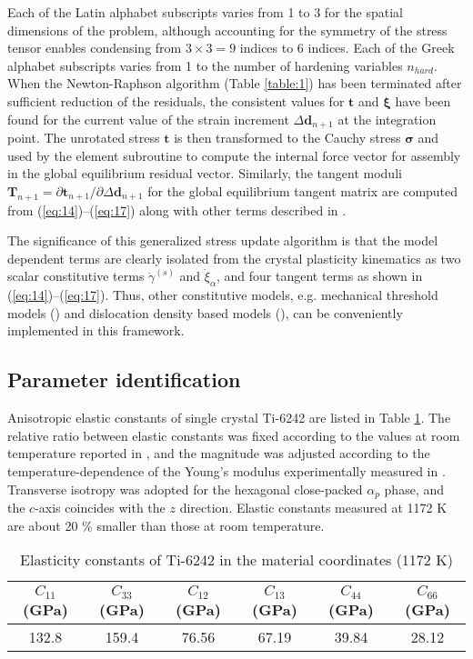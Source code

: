 \documentclass[review]{elsarticle}
\begin{document}
	Each of the Latin alphabet subscripts varies from 1 to 3 for the spatial dimensions of the problem, although accounting for the symmetry of the stress tensor enables condensing from $3\times 3=9$ indices to 6 indices.
	Each of the Greek alphabet subscripts varies from 1 to the number of hardening variables $n_{hard}$.
	When the Newton-Raphson algorithm (Table \ref{table:1}) has been terminated after sufficient reduction of the residuals, the consistent values for $\mathbf{t}$ and $\bm{\xi}$ have been found for the current value of the strain increment $\Delta \mathbf{d}_{n+1}$ at the integration point.
	The unrotated stress $\mathbf{t}$ is then transformed to the Cauchy stress $\bm{\sigma}$ and used by the element subroutine to compute the internal force vector for assembly in the global equilibrium residual vector.
	Similarly, the tangent moduli $\mathbf{T}_{n+1}=\partial \mathbf{t}_{n+1} / \partial \Delta\mathbf{d}_{n+1}$ for the global equilibrium tangent matrix are computed from (\ref{eq:14})--(\ref{eq:17}) along with other terms described in \cite{r22}.
	
	The significance of this generalized stress update algorithm is that the model dependent terms are clearly isolated from the crystal plasticity kinematics as two scalar constitutive terms $\dot{\gamma}^{(s)}$ and $\dot{\xi}_{\alpha}$, and four tangent terms as shown in (\ref{eq:14})--(\ref{eq:17}).
	Thus, other constitutive models, e.g. mechanical threshold models (\cite{r24}) and dislocation density based models (\cite{r25}), can be conveniently implemented in this framework.

	\subsection{Parameter identification}
	\label{parameter}
	Anisotropic elastic constants of single crystal Ti-6242 are listed in Table \ref{table:2}.
	The relative ratio between elastic constants was fixed according to the values at room temperature reported in \cite{r18}, and the magnitude was adjusted according to the temperature-dependence of the Young's modulus experimentally measured in \cite{r26}.
	Transverse isotropy was adopted for the hexagonal close-packed $\alpha _p$ phase, and the $c$-axis coincides with the $z$ direction.
	Elastic constants measured at 1172 K are about 20 \% smaller than those at room temperature.
	\begin{table}[!htb]
	\centering
	\caption{\label{table:2}Elasticity constants of Ti-6242 in the material coordinates (1172 K)}
	\begin{tabular}{c c c c c c}
	\hline
	$C_{11}$(GPa)&$C_{33}$(GPa)&$C_{12}$(GPa)&$C_{13}$(GPa)&$C_{44}$(GPa)&$C_{66}$(GPa)\\
	\hline
	132.8 & 159.4 & 76.56 & 67.19 & 39.84 & 28.12\\
	\hline
	\end{tabular}
	\end{table}
	
\end{document}
